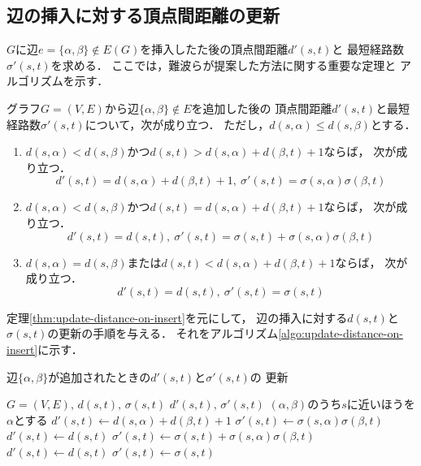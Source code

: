 \subsection*{辺の挿入に対する頂点間距離の更新}
$G$に辺$e=\{\alpha,\beta\}\notin E(G)$を挿入したた後の頂点間距離$d'(s,t)$と
最短経路数$\sigma'(s,t)$を求める．
ここでは，難波ら\cite{Nanba2016}が提案した方法に関する重要な定理と
アルゴリズムを示す．
\begin{theorem-without-proof}
  \label{thm:update-distance-on-insert}
  グラフ$G=(V,E)$から辺$\{\alpha,\beta\}\notin E$を追加した後の
  頂点間距離$d'(s,t)$と最短経路数$\sigma'(s,t)$について，次が成り立つ．
  ただし，$d(s,\alpha)\leq d(s,\beta)$とする．
  \begin{enumerate}
  \item $d(s,\alpha)<d(s,\beta)$かつ$d(s,t)>d(s,\alpha)+d(\beta,t)+1$ならば，
    次が成り立つ．
    \[ d'(s,t)=d(s,\alpha)+d(\beta,t)+1,\:
    \sigma'(s,t)=\sigma(s,\alpha)\sigma(\beta,t) \]
  \item $d(s,\alpha)<d(s,\beta)$かつ$d(s,t)=d(s,\alpha)+d(\beta,t)+1$ならば，
    次が成り立つ．
    \[ d'(s,t)=d(s,t),\:
    \sigma'(s,t)=\sigma(s,t)+\sigma(s,\alpha)\sigma(\beta,t) \]
  \item $d(s,\alpha)=d(s,\beta)$または$d(s,t)<d(s,\alpha)+d(\beta,t)+1$ならば，
    次が成り立つ．
    \[ d'(s,t)=d(s,t),\:\sigma'(s,t)=\sigma(s,t) \]
  \end{enumerate}
\end{theorem-without-proof}

定理\ref{thm:update-distance-on-insert}を元にして，
辺の挿入に対する$d(s,t)$と$\sigma(s,t)$の更新の手順を与える．
それをアルゴリズム\ref{algo:update-distance-on-insert}に示す．
\begin{algorithm}[H]
  \caption{辺$\{\alpha,\beta\}$が追加されたときの$d'(s,t)$と$\sigma'(s,t)$の
    更新}\label{algo:update-distance-on-insert}
  \begin{algorithmic}[1]
    \Require $G=(V,E),\,d(s,t),\,\sigma(s,t)$
    \Ensure $d'(s,t),\,\sigma'(s,t)$
    \State $(\alpha,\beta)$のうち$s$に近いほうを$\alpha$とする
    \State $d'(s,t)\gets d(s,\alpha)+d(\beta,t)+1$
    \State $\sigma'(s,t)\gets \sigma(s,\alpha)\sigma(\beta,t)$
    \State $d'(s,t)\gets d(s,t)$
    \State $\sigma'(s,t)\gets \sigma(s,t)+\sigma(s,\alpha)\sigma(\beta,t)$
    \State $d'(s,t)\gets d(s,t)$
    \State $\sigma'(s,t)\gets\sigma(s,t)$
    \Else
    \EndIf
    \EndFor
  \end{algorithmic}
\end{algorithm}

